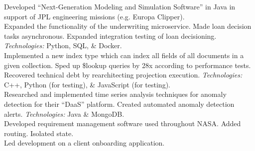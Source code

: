 \documentclass[11pt,letter,sans]{moderncv}
\begin{document}
Developed ``Next-Generation Modeling and Simulation Software'' in Java in support of JPL engineering missions (e.g. Europa Clipper).
\\
Expanded the functionality of the underwriting microservice.
Made loan decision tasks asynchronous.
Expanded integration testing of loan decisioning.
\textit{Technologies:} Python, SQL, \& Docker.
\\
Implemented a new index type which can index all fields of all documents in a given collection.
Sped up \$lookup queries by 28x according to performance tests.
Recovered technical debt by rearchitecting projection execution.
\textit{Technologies:} C++, Python (for testing), \& JavaScript (for testing).
\\
Researched and implemented time series analysis techniques for anomaly detection for their ``DaaS'' platform. Created automated anomaly detection alerts.
\textit{Technologies:} Java \& MongoDB.
\\
Developed requirement management software used throughout NASA.
Added routing. Isolated state.
\\
Led development on a client onboarding application.
\end{document}
